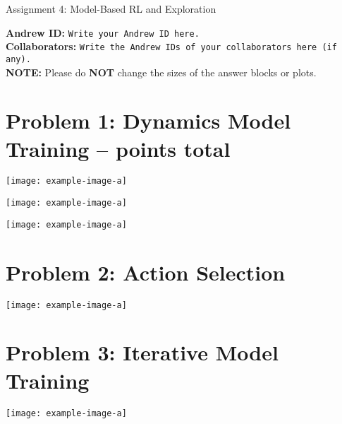\documentclass{article}
\begin{document}

\begin{centering}
    {\Large Assignment 4: Model-Based RL and Exploration
} \\
    \vspace{.25cm}
\end{centering}
\vspace{0.25cm}

\textbf{Andrew ID:} \texttt{Write your Andrew ID here.} \\
\textbf{Collaborators:} \texttt{Write the Andrew IDs of your collaborators here (if any).}\\ 
\textbf{NOTE:} Please do \textbf{NOT} change the sizes of the answer blocks or plots.

\section{Problem 1: Dynamics Model Training --  points total\rbrack}
\begin{answer}[title=Theory questions,height=4.5cm,width=\linewidth]
\end{answer}


\begin{answer}[title=Plot,height=9.5cm,width=\linewidth]
\centering
\texttt{[image: example-image-a]}
\end{answer}

\begin{answer}[title=Plot,height=9.5cm,width=\linewidth]
\centering
\texttt{[image: example-image-a]}
\end{answer}

\begin{answer}[title=Plot,height=9.5cm,width=\linewidth]
\centering
\texttt{[image: example-image-a]}
\end{answer}

\section{Problem 2: Action Selection}
\begin{answer}[title=Plot,height=9.5cm,width=\linewidth]
\centering
\texttt{[image: example-image-a]}
\end{answer}



\section{Problem 3: Iterative Model Training}
\begin{answer}[title=Plot,height=9.5cm,width=\linewidth]
\centering
\texttt{[image: example-image-a]}
\end{answer}
\end{document}
